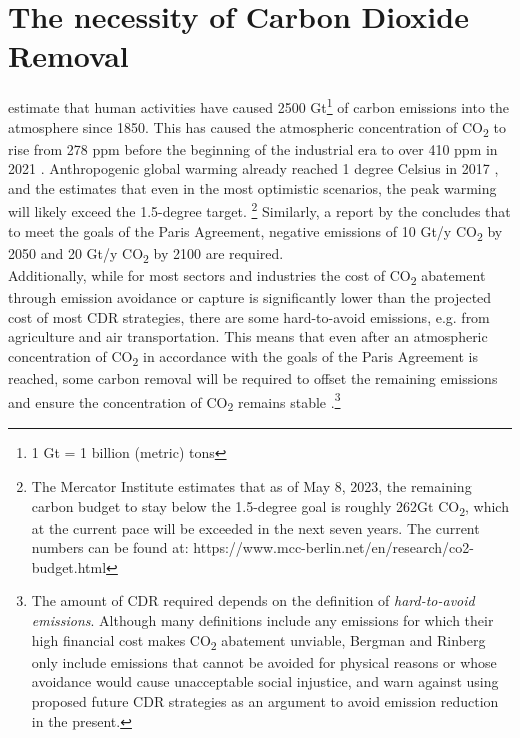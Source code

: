 \section{The necessity of Carbon Dioxide Removal}
\textcite{Bergman2021TheJustice} estimate that human activities have caused 2500 Gt\footnote{ 1 Gt = 1 billion (metric) tons} of carbon emissions into the atmosphere since 1850. This has caused the atmospheric concentration of CO\textsubscript{2} to rise from 278 ppm before the beginning of the industrial era to over 410 ppm in 2021 \parencite[5]{Friedlingstein2022Global2022}. Anthropogenic global warming already reached 1 degree Celsius in 2017 \parencite[6]{IPCC2018Global1.5C}, and the \textcite[30]{UNEP2022Emissions2022} estimates that even in the most optimistic scenarios, the peak warming will likely exceed the 1.5-degree target. \footnote{The Mercator Institute estimates that as of May 8, 2023, the remaining carbon budget to stay below the 1.5-degree goal is roughly 262Gt CO\textsubscript{2}, which at the current pace will be exceeded in the next seven years. The current numbers can be found at: https://www.mcc-berlin.net/en/research/co2-budget.html} Similarly, a report by the \textcite[9]{NAS2018NegativeAgenda} concludes that to meet the goals of the Paris Agreement, negative emissions of 10 Gt/y CO\textsubscript{2} by 2050 and 20 Gt/y CO\textsubscript{2} by 2100 are required.\\
Additionally, while for most sectors and industries the cost of CO\textsubscript{2} abatement through emission avoidance or capture is significantly lower than the projected cost of most CDR strategies, there are some hard-to-avoid emissions, e.g. from agriculture and air transportation. This means that even after an atmospheric concentration of CO\textsubscript{2} in accordance with the goals of the Paris Agreement is reached, some carbon removal will be required to offset the remaining emissions and ensure the concentration of CO\textsubscript{2} remains stable \parencite{NRC2015ClimateSequestration}.\footnote{The amount of CDR required depends on the definition of \textit{hard-to-avoid emissions}. Although many definitions include any emissions for which their high financial cost makes CO\textsubscript{2} abatement unviable, Bergman and Rinberg only include emissions that cannot be avoided for physical reasons or whose avoidance would cause unacceptable social injustice, and warn against using proposed future CDR strategies as an argument to avoid emission reduction in the present.}
